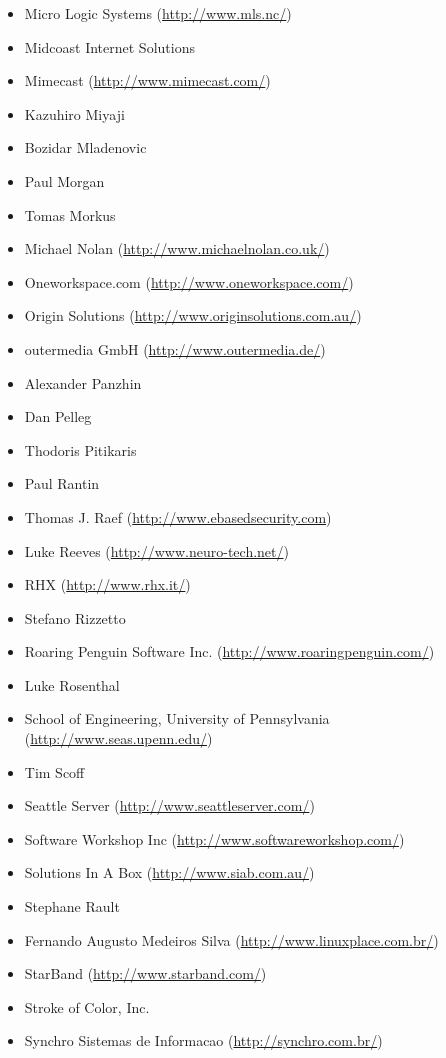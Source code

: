 \documentclass[a4paper,titlepage,12pt]{article}
\begin{document}
\begin{itemize}
	\item Micro Logic Systems (\url{http://www.mls.nc/})
	\item Midcoast Internet Solutions
	\item Mimecast (\url{http://www.mimecast.com/})
	\item Kazuhiro Miyaji
	\item Bozidar Mladenovic
	\item Paul Morgan
	\item Tomas Morkus
	\item Michael Nolan (\url{http://www.michaelnolan.co.uk/})
	\item Oneworkspace.com (\url{http://www.oneworkspace.com/})
	\item Origin Solutions (\url{http://www.originsolutions.com.au/})
	\item outermedia GmbH (\url{http://www.outermedia.de/})
	\item Alexander Panzhin
	\item Dan Pelleg
	\item Thodoris Pitikaris
	\item Paul Rantin
	\item Thomas J. Raef (\url{http://www.ebasedsecurity.com})
	\item Luke Reeves (\url{http://www.neuro-tech.net/})
	\item RHX (\url{http://www.rhx.it/})
	\item Stefano Rizzetto
	\item Roaring Penguin Software Inc. (\url{http://www.roaringpenguin.com/})
	\item Luke Rosenthal
	\item School of Engineering, University of Pennsylvania (\url{http://www.seas.upenn.edu/})
	\item Tim Scoff
	\item Seattle Server (\url{http://www.seattleserver.com/})
	\item Software Workshop Inc (\url{http://www.softwareworkshop.com/})
	\item Solutions In A Box (\url{http://www.siab.com.au/})
	\item Stephane Rault
	\item Fernando Augusto Medeiros Silva (\url{http://www.linuxplace.com.br/})
	\item StarBand (\url{http://www.starband.com/})
	\item Stroke of Color, Inc.
	\item Synchro Sistemas de Informacao (\url{http://synchro.com.br/})

\end{itemize}
\end{document}
